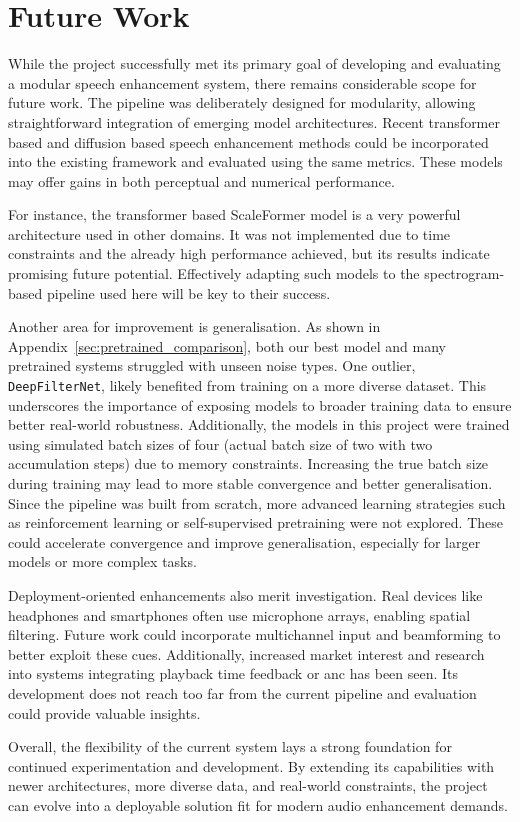 \chapter{Future Work}
\label{chp:future_work}

While the project successfully met its primary goal of developing and evaluating a modular speech enhancement system, there remains considerable scope for future work. The pipeline was deliberately designed for modularity, allowing straightforward integration of emerging model architectures. Recent transformer based and diffusion based speech enhancement methods could be incorporated into the existing framework and evaluated using the same metrics. These models may offer gains in both perceptual and numerical performance.

For instance, the transformer based ScaleFormer model \cite{wu2023scaleformer}
is a very powerful architecture used in other domains. It was not implemented due to time constraints and the already high performance achieved, but its results indicate promising future potential. Effectively adapting such models to the spectrogram-based pipeline used here will be key to their success.

Another area for improvement is generalisation. As shown in Appendix~\ref{sec:pretrained_comparison}, both our best model and many pretrained systems struggled with unseen noise types. One outlier, \texttt{DeepFilterNet}, likely benefited from training on a more diverse dataset. This underscores the importance of exposing models to broader training data to ensure better real-world robustness. Additionally, the models in this project were trained using simulated batch sizes of four (actual batch size of two with two accumulation steps) due to memory constraints. Increasing the true batch size during training may lead to more stable convergence and better generalisation. Since the pipeline was built from scratch, more advanced learning strategies such as reinforcement learning or self-supervised pretraining were not explored. These could accelerate convergence and improve generalisation, especially for larger models or more complex tasks.

Deployment-oriented enhancements also merit investigation. Real devices like headphones and smartphones often use microphone arrays, enabling spatial filtering. Future work could incorporate multichannel input and beamforming to better exploit these cues. Additionally, increased market interest and research into systems integrating playback time feedback or \gls{anc} has been seen. Its development does not reach too far from the current pipeline and evaluation could provide valuable insights.

Overall, the flexibility of the current system lays a strong foundation for continued experimentation and development. By extending its capabilities with newer architectures, more diverse data, and real-world constraints, the project can evolve into a deployable solution fit for modern audio enhancement demands.


